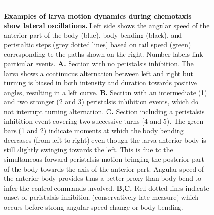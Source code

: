 \documentclass[11pt,a4paper]{article}
\newcommand{\todoBW}[1]{\todo[author=BW,color=orange, size=\tiny,inline]{#1}}
\begin{document}
\begin{figure}[ht!]
\begin{center}
\caption{{\bf Examples of larva motion dynamics during chemotaxis show lateral oscillations.} 
Left side shows the angular speed of the anterior part of the body (blue), body bending (black), and peristaltic steps (grey dotted lines) based on tail speed (green) corresponding to the paths shown on the right. Number labels link particular events. 
{\bf A.} Section with no peristalsis inhibition. The larva shows a continuous alternation between left and right but turning is biased in both intensity and duration towards positive angles, resulting in a left curve.
{\bf B.} Section with an intermediate (1) and two stronger (2 and 3) peristalsis inhibition events, which do not interrupt turning alternation.
{\bf C.} Section including a peristalsis inhibition event covering two successive turns (4 and 5). The green bars (1 and 2) indicate moments at which the body bending decreases (from left to right) even though the larva anterior body is still slightly swinging towards the left. This is due to the simultaneous forward peristalsis motion bringing the posterior part of the body towards the axis of the anterior part. Angular speed of the anterior body provides thus a better proxy than body bend to infer the control commands involved.
 {\bf B,C.} Red dotted lines indicate onset of peristalsis inhibition (conservatively late measure) which occurs before strong angular speed change or body bending. 
\label{fig:DynamicsExample}
}
\end{center}
\hrule
\end{figure}

%
%
\end{document}
